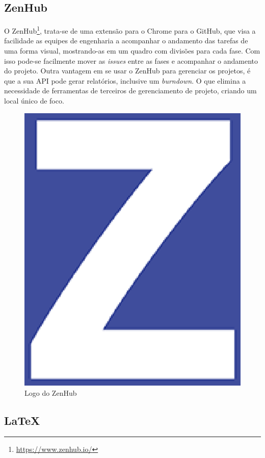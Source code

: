 \subsection{ZenHub}

O ZenHub\footnote{\url{https://www.zenhub.io/}}, trata-se de uma extensão para o Chrome para o GitHub, que visa a facilidade as equipes de engenharia a acompanhar o andamento das tarefas de uma forma visual, mostrando-as em um quadro com divisões para cada fase. Com isso pode-se facilmente mover as \textit{issues} entre as fases e acompanhar o andamento do projeto. Outra vantagem em se usar o ZenHub para gerenciar os projetos, é que a sua API pode gerar relatórios, inclusive um \textit{burndown}. O que elimina a necessidade de ferramentas de terceiros de gerenciamento de projeto, criando um local único de foco.

\begin{figure}[!h]
	\centering
	\includegraphics[scale=0.35]{figuras/capitulo3/zenhub.eps}
	\caption{Logo do ZenHub}
	\label{zenhub}
\end{figure}

\subsection{LaTeX}

